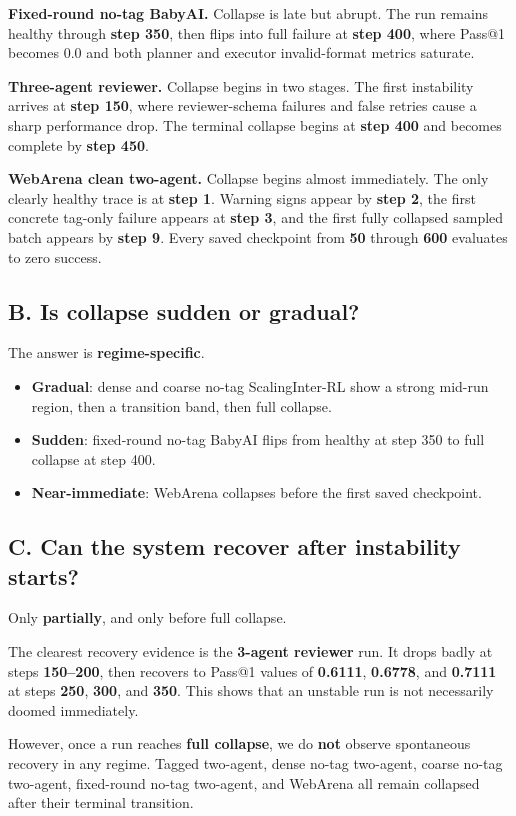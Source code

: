 \documentclass{ieeeaccess}
\begin{document}
\textbf{Fixed-round no-tag BabyAI.} Collapse is late but abrupt. The run remains healthy through \textbf{step 350}, then flips into full failure at \textbf{step 400}, where Pass@1 becomes $0.0$ and both planner and executor invalid-format metrics saturate.

\textbf{Three-agent reviewer.} Collapse begins in two stages. The first instability arrives at \textbf{step 150}, where reviewer-schema failures and false retries cause a sharp performance drop. The terminal collapse begins at \textbf{step 400} and becomes complete by \textbf{step 450}.

\textbf{WebArena clean two-agent.} Collapse begins almost immediately. The only clearly healthy trace is at \textbf{step 1}. Warning signs appear by \textbf{step 2}, the first concrete tag-only failure appears at \textbf{step 3}, and the first fully collapsed sampled batch appears by \textbf{step 9}. Every saved checkpoint from \textbf{50} through \textbf{600} evaluates to zero success.

\subsection{B. Is collapse sudden or gradual?}
The answer is \textbf{regime-specific}.
\begin{itemize}
\item \textbf{Gradual}: dense and coarse no-tag ScalingInter-RL show a strong mid-run region, then a transition band, then full collapse.
\item \textbf{Sudden}: fixed-round no-tag BabyAI flips from healthy at step 350 to full collapse at step 400.
\item \textbf{Near-immediate}: WebArena collapses before the first saved checkpoint.
\end{itemize}

\subsection{C. Can the system recover after instability starts?}
Only \textbf{partially}, and only before full collapse.

The clearest recovery evidence is the \textbf{3-agent reviewer} run. It drops badly at steps \textbf{150--200}, then recovers to Pass@1 values of \textbf{0.6111}, \textbf{0.6778}, and \textbf{0.7111} at steps \textbf{250}, \textbf{300}, and \textbf{350}. This shows that an unstable run is not necessarily doomed immediately.

However, once a run reaches \textbf{full collapse}, we do \textbf{not} observe spontaneous recovery in any regime. Tagged two-agent, dense no-tag two-agent, coarse no-tag two-agent, fixed-round no-tag two-agent, and WebArena all remain collapsed after their terminal transition.
\end{document}
